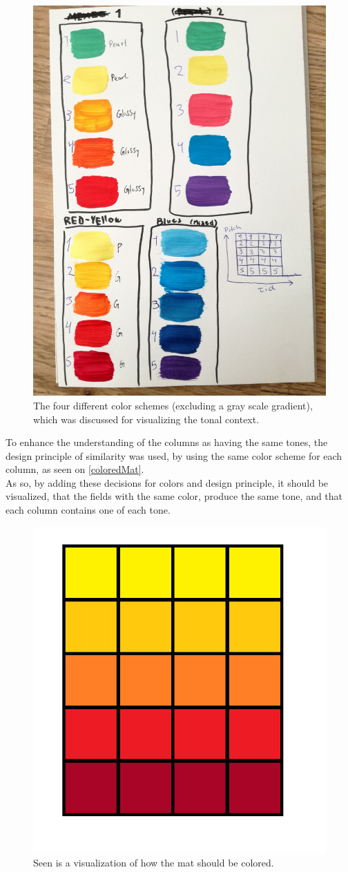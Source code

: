 \begin{figure}[H]
	\centering
	\includegraphics[width=0.5\linewidth]{figure/Design/colors}
	\caption{The four different color schemes (excluding a gray scale gradient), which was discussed for visualizing the tonal context.}	
	\label{fig:colors}
\end{figure}

To enhance the understanding of the columns as having the same tones, the design principle of similarity was used, by using the same color scheme for each column, as seen on \autoref{coloredMat}. \\
As so, by adding these decisions for colors and design principle, it should be visualized, that the fields with the same color, produce the same tone, and that each column contains one of each tone.  

\begin{figure}[H]
	\centering
	\includegraphics[width=0.5\linewidth]{figure/Design/coloredMat}
	\caption{Seen is a visualization of how the mat should be colored.}	
	\label{fig:coloredMat}
 \end{figure}


